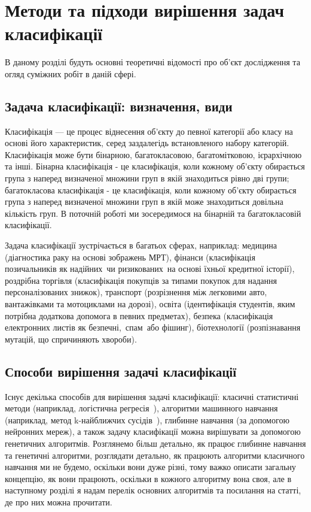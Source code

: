 
\chapter{Методи та підходи вирішення задач класифікації}
\label{chap:review}  %

В даному розділі будуть основні теоретичні відомості про об'єкт дослідження та огляд суміжних робіт в даній сфері.

\section{Задача класифікації: визначення, види}

Класифікація — це процес віднесення об'єкту до певної категорії або класу на основі його характеристик, серед заздалегідь встановленого набору категорій. Класифікація може бути бінарною, багатокласовою, багатомітковою, ієрархічною та інші. Бінарна класифікація - це класифікація, коли кожному об'єкту обирається група з наперед визначеної множини груп в якій знаходиться рівно дві групи; багатокласова класифікація - це класифікація, коли кожному об'єкту обирається група з наперед визначеної множини груп в якій може знаходиться довільна кількість груп. В поточній роботі ми зосередимося на бінарній та багатокласовій класифікації.

Задача класифікації зустрічається в багатьох сферах, наприклад: медицина (діагностика раку на основі зображень МРТ), фінанси (класифікація позичальників як \glqq надійних\grqq\ чи \glqq ризикованих\grqq\ на основі їхньої кредитної історії), роздрібна торгівля (класифікація покупців за типами покупок для надання персоналізованих знижок), транспорт (розрізнення між легковими авто, вантажівками та мотоциклами на дорозі), освіта (ідентифікація студентів, яким потрібна додаткова допомога в певних предметах), безпека (класифікація електронних листів як \glqq безпечні,\grqq\ \glqq спам\grqq\ або \glqq фішинг\grqq), біотехнології (розпізнавання мутацій, що спричиняють хвороби). 

\section{Способи вирішення задачі класифікації}

Існує декілька способів для вирішення задачі класифікації: класичні статистичні методи (наприклад, логістична регресія~\cite{ct1}), алгоритми машинного навчання (наприклад, метод k-найближчих сусідів~\cite{ct4}), глибинне навчання (за допомогою нейронних мереж), а також задачу класифікації можна вирішувати за допомогою генетичних алгоритмів. Розглянемо більш детально, як працює глибинне навчання та генетичні алгоритми, розглядати детально, як працюють алгоритми класичного навчання ми не будемо, оскільки вони дуже різні, тому важко описати загальну концепцію, як вони працюють, оскільки в кожного алгоритму вона своя, але в наступному розділі я надам перелік основних алгоритмів та посилання на статті, де про них можна прочитати. 

